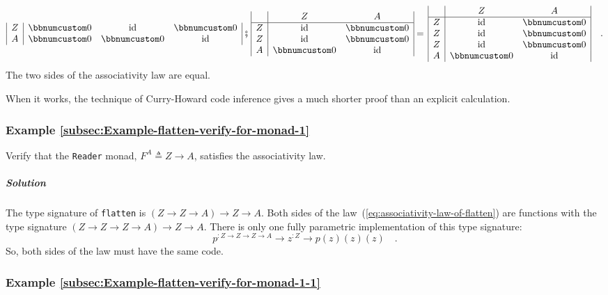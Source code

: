 \begin{align*}
\begin{array}{|c|ccc|}
Z & \bbnum 0 & \text{id} & \bbnum 0\\
A & \bbnum 0 & \bbnum 0 & \text{id}
\end{array}\,\bef\,\begin{array}{|c|cc|}
 & Z & A\\
\hline Z & \text{id} & \bbnum 0\\
Z & \text{id} & \bbnum 0\\
A & \bbnum 0 & \text{id}
\end{array}=\,\begin{array}{|c|cc|}
 & Z & A\\
\hline Z & \text{id} & \bbnum 0\\
Z & \text{id} & \bbnum 0\\
Z & \text{id} & \bbnum 0\\
A & \bbnum 0 & \text{id}
\end{array}\quad.
\end{align*}
The two sides of the associativity law are equal.

When it works, the technique of Curry-Howard code inference gives
a much shorter proof than an explicit calculation.

\subsubsection{Example \label{subsec:Example-flatten-verify-for-monad-1}\ref{subsec:Example-flatten-verify-for-monad-1}}

Verify that the \lstinline!Reader! monad, $F^{A}\triangleq Z\rightarrow A$,
satisfies the associativity law.

\subparagraph{Solution}

The type signature of \lstinline!flatten! is $\left(Z\rightarrow Z\rightarrow A\right)\rightarrow Z\rightarrow A$.
Both sides of the law~(\ref{eq:associativity-law-of-flatten}) are
functions with the type signature $(Z\rightarrow Z\rightarrow Z\rightarrow A)\rightarrow Z\rightarrow A$.
There is only one fully parametric implementation of this type signature:
\[
p^{:Z\rightarrow Z\rightarrow Z\rightarrow A}\rightarrow z^{:Z}\rightarrow p(z)(z)(z)\quad.
\]
So, both sides of the law must have the same code.

\subsubsection{Example \label{subsec:Example-flatten-verify-for-monad-1-1}\ref{subsec:Example-flatten-verify-for-monad-1-1}}


